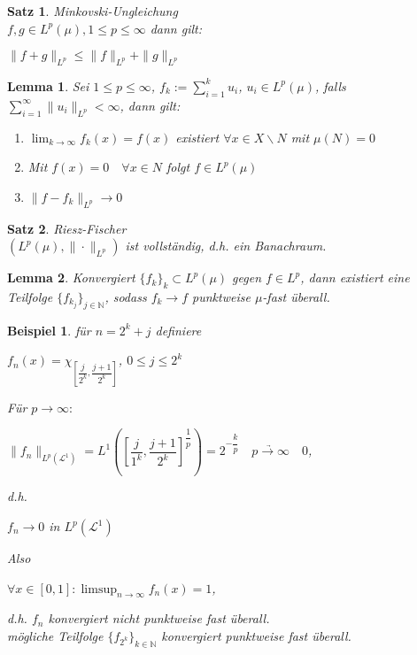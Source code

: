 \documentclass[11pt]{memoir}
\theoremstyle{changebreak}
\newtheorem{Beispiel}{Beispiel}[chapter]
\newtheorem{Lemma}{Lemma}[chapter]
\newtheorem{Satz}{Satz}[chapter]
\begin{document}
\begin{Satz}
\emph{Minkovski-Ungleichung} \\
$f, g \in L^p(\mu), 1 \leq p \leq \infty$ dann gilt:
\begin{center}
	$\|f+g\|_{L^p} \leq \|f\|_{L^p} + \|g\|_{L^p}$
\end{center}
\end{Satz}

\begin{Lemma}
Sei $1 \leq p \leq \infty$, $f_k := \sum\limits_{i=1}^k u_i$, $u_i \in L^p(\mu)$, falls $\sum\limits_{i=1}^\infty \|u_i\|_{L^p} < \infty$, dann gilt:
\begin{enumerate}
	\item $\lim_{k \rightarrow \infty} f_k (x) = f(x)$ existiert $\forall x \in X\backslash N$ mit $\mu(N) =0$
	\item Mit $f(x) = 0\quad \forall x \in N$ folgt $f \in L^p(\mu)$
	\item $\|f-f_k\|_{L^p} \rightarrow 0$
\end{enumerate}
\end{Lemma}





\begin{Satz}
\emph{Riesz-Fischer} \\
$\left(L^p(\mu), \|\cdotp\|_{L^p}\right)$ ist vollständig, d.h. ein Banachraum.
\end{Satz}

\begin{Lemma}
Konvergiert $\{f_k\}_k \subset L^p (\mu)$ gegen $f \in L^p$, dann existiert eine Teilfolge $\{f_{k_j}\}_{j \in \mathbb N}$, sodass $f_k \rightarrow f$ punktweise $\mu$-fast überall.
\end{Lemma}

\begin{Beispiel}
für $n = 2^k + j$ definiere 
\begin{center}
	$f_n(x) = \chi_{\left[\dfrac{j}{2^k}, \dfrac{j+1}{2^k}\right]}$, $0 \leq j \leq 2^k$ 
\end{center}
Für $p \rightarrow \infty: $
\begin{center}
	$\|f_n\|_{L^p(\mathscr L^1)} = L^1\left(\left[\dfrac{j}{1^k}, \dfrac{j+1}{2^k} \right] ^{\dfrac{1}{p}} \right) = 2^{-\dfrac{k}{p}} \quad \underrightarrow{p \rightarrow \infty} \quad  0$, 
\end{center}
d.h. 
\begin{center}
	$f_n \rightarrow 0$ in $L^p(\mathscr L^1)$ 
\end{center}
Also 
\begin{center}
	$\forall x \in [0, 1]: \limsup_{n \rightarrow \infty} f_n (x) = 1$,
\end{center} 
d.h. $f_n$ konvergiert nicht punktweise fast überall. \\
mögliche Teilfolge $\{f_{2^k}\}_{k \in \mathbb N}$ konvergiert punktweise fast überall.
\end{Beispiel}
\end{document}
